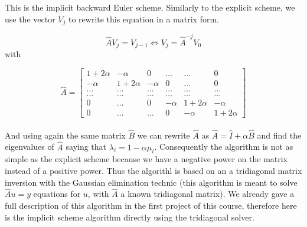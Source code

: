 \documentclass[a4paper, twoside, 11pt]{report}
\theoremstyle{theorem}
\theoremstyle{remark}
\theoremstyle{exemple}
\begin{document}
                    This is the implicit backward Euler scheme. Similarly to the explicit scheme, we use the vector $V_j$ to rewrite this equation in a matrix form.

                    \begin{equation*}
                        \hat{A}V_j = V_{j-1} \Longleftrightarrow V_j=\hat{A}^{-j} V_0
                    \end{equation*}
                    with

                    \begin{equation*}
                        \hat{A} = \left[\begin{matrix}
                                          1+2\alpha & -\alpha & 0 & \dots & \dots & 0\\
                                          -\alpha & 1+2\alpha & -\alpha & 0 & \dots & 0 \\
                                          \dots & \dots & \dots & \dots & \dots & \dots\\
                                          \dots & \dots & \dots & \dots & \dots & \dots\\
                                          0 & \dots & 0 & -\alpha & 1+2\alpha & -\alpha \\
                                          0 & \dots & \dots & 0 & -\alpha & 1+2\alpha
                                        \end{matrix} \right]
                    \end{equation*}

                    \paragraph{}And using again the same matrix $\hat{B}$ we can rewrite $\hat A$ as $\hat{A}=\hat{I}+\alpha \hat{B}$ and find the eigenvalues of $\hat{A}$ saying that $\lambda_i = 1 - \alpha \mu_i$. Consequently the algorithm is not as simple as the explicit scheme because we have a negative power on the matrix instead of a positive power. Thus the algorithl is based on an a tridiagonal matrix inversion with the Gaussian elimination technic (this algorithm is meant to solve $\hat{A}u=y$ equations for $u$, with $\hat{A}$ a known tridiagonal matrix). We already gave a full description of this algorithm in the first project of this course, therefore here is the implicit scheme algorithm directly using the tridiagonal solver.
\end{document}
